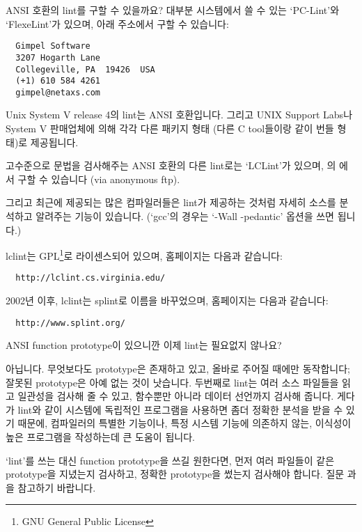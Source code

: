 \begin{faq}
	ANSI 호환의 lint를 구할 수 있을까요?
\A
	대부분 시스템에서 쓸 수 있는 `PC-Lint'와 `FlexeLint'가 있으며,
	아래 주소에서 구할 수 있습니다:
\begin{verbatim}
  Gimpel Software
  3207 Hogarth Lane
  Collegeville, PA  19426  USA
  (+1) 610 584 4261
  gimpel@netaxs.com
\end{verbatim}

	Unix System V release 4의 lint는 ANSI 호환입니다.  그리고
	UNIX Support Labs나 System V 판매업체에 의해 각각 다른 패키지
	형태 (다른 C tool들이랑 같이 번들 형태)로 제공됩니다.

	고수준으로 문법을 검사해주는 ANSI 호환의 다른 lint로는
	`LCLint'가 있으며, 의 에서
	구할 수 있습니다 (via anonymous ftp).

	그리고 최근에 제공되는 많은 컴파일러들은 lint가 제공하는 것처럼
	자세히 소스를 분석하고 알려주는 기능이 있습니다.  (`gcc'의 경우는
	`-Wall -pedantic' 옵션을 쓰면 됩니다.)

\T
	lclint는 GPL\footnote{GNU General Public License}로 
	라이센스되어 있으며, 홈페이지는 다음과 같습니다:
\begin{verbatim}
  http://lclint.cs.virginia.edu/
\end{verbatim}

	2002년 이후, lclint는 splint로 이름을 바꾸었으며, 홈페이지는
        다음과 같습니다:
\begin{verbatim}
  http://www.splint.org/
\end{verbatim}
\end{faq}

\begin{faq}
	ANSI function prototype이 있으니깐 이제 lint는 필요없지 않나요?
\A

	아닙니다.  무엇보다도 prototype은 존재하고 있고, 올바로 주어질 때에만
	동작합니다; 잘못된 prototype은 아예 없는 것이 낫습니다.  두번째로
	lint는 여러 소스 파일들을 읽고 일관성을 검사해 줄 수 있고,
	함수뿐만 아니라 데이터 선언까지 검사해 줍니다.
	게다가 lint와 같이 시스템에 독립적인 프로그램을 사용하면 좀더
	정확한 분석을 받을 수 있기 때문에, 컴파일러의 특별한 기능이나,
	특정 시스템 기능에 의존하지 않는, 이식성이 높은 프로그램을 작성하는데
	큰 도움이 됩니다.

	`lint'를 쓰는 대신 function prototype을 쓰길 원한다면,
	먼저 여러 파일들이 같은 prototype을 지녔는지 검사하고,
	정확한 prototype을 썼는지 검사해야 합니다.  질문 과 을
	참고하기 바랍니다.
\end{faq}

